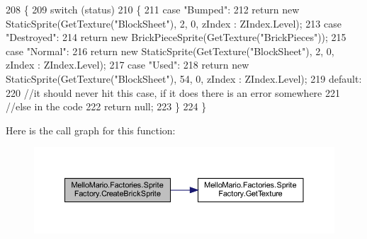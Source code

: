 \begin{DoxyCode}
208         \{
209             \textcolor{keywordflow}{switch} (status)
210             \{
211                 \textcolor{keywordflow}{case} \textcolor{stringliteral}{"Bumped"}:
212                     \textcolor{keywordflow}{return} \textcolor{keyword}{new} StaticSprite(GetTexture(\textcolor{stringliteral}{"BlockSheet"}), 2, 0, zIndex : 
      ZIndex.Level);
213                 \textcolor{keywordflow}{case} \textcolor{stringliteral}{"Destroyed"}:
214                     \textcolor{keywordflow}{return} \textcolor{keyword}{new} BrickPieceSprite(GetTexture(\textcolor{stringliteral}{"BrickPieces"}));
215                 \textcolor{keywordflow}{case} \textcolor{stringliteral}{"Normal"}:
216                     \textcolor{keywordflow}{return} \textcolor{keyword}{new} StaticSprite(GetTexture(\textcolor{stringliteral}{"BlockSheet"}), 2, 0, zIndex : 
      ZIndex.Level);
217                 \textcolor{keywordflow}{case} \textcolor{stringliteral}{"Used"}:
218                     \textcolor{keywordflow}{return} \textcolor{keyword}{new} StaticSprite(GetTexture(\textcolor{stringliteral}{"BlockSheet"}), 54, 0, zIndex : 
      ZIndex.Level);
219                 \textcolor{keywordflow}{default}:
220                     \textcolor{comment}{//it should never hit this case, if it does there is an error somewhere}
221                     \textcolor{comment}{//else in the code}
222                     \textcolor{keywordflow}{return} null;
223             \}
224         \}
\end{DoxyCode}
Here is the call graph for this function\+:
\nopagebreak
\begin{figure}[H]
\begin{center}
\leavevmode
\includegraphics[width=350pt]{classMelloMario_1_1Factories_1_1SpriteFactory_a713b8a98b7272c7d9f6f97cedefb8a22_cgraph}
\end{center}
\end{figure}
\mbox{\label{classMelloMario_1_1Factories_1_1SpriteFactory_af7d4d69077fbfe7c1181eb5289bf2ddf}} 
